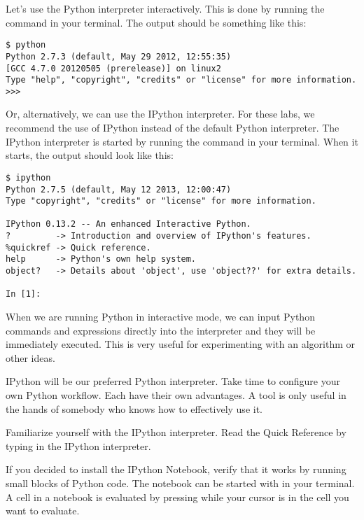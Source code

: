 Let's use the Python interpreter interactively.
This is done by running the command  in your terminal.
The output should be something like this:
\begin{lstlisting}
$ python
Python 2.7.3 (default, May 29 2012, 12:55:35) 
[GCC 4.7.0 20120505 (prerelease)] on linux2
Type "help", "copyright", "credits" or "license" for more information.
>>> 
\end{lstlisting}
Or, alternatively, we can use the IPython interpreter.  
For these labs, we recommend the use of IPython instead of the default Python interpreter.
The IPython interpreter is started by running the command  in your terminal.
When it starts, the output should look like this:
\begin{lstlisting}
$ ipython
Python 2.7.5 (default, May 12 2013, 12:00:47) 
Type "copyright", "credits" or "license" for more information.

IPython 0.13.2 -- An enhanced Interactive Python.
?         -> Introduction and overview of IPython's features.
%quickref -> Quick reference.
help      -> Python's own help system.
object?   -> Details about 'object', use 'object??' for extra details.

In [1]: 
\end{lstlisting}
When we are running Python in interactive mode, we can input Python commands and expressions directly into the interpreter and they will be immediately executed. 
This is very useful for experimenting with an algorithm or other ideas.

IPython will be our preferred Python interpreter.  Take time to configure your own Python
workflow.  Each have their own advantages.  A tool is only useful in the hands of somebody
who knows how to effectively use it.
\begin{problem}
Familiarize yourself with the IPython interpreter.
Read the Quick Reference by typing  in the IPython interpreter.

If you decided to install the IPython Notebook, verify that it works by running small blocks of Python code.
The notebook can be started with  in your terminal.
A cell in a notebook is evaluated by pressing  while your cursor is in the cell you want to evaluate.
\end{problem}
